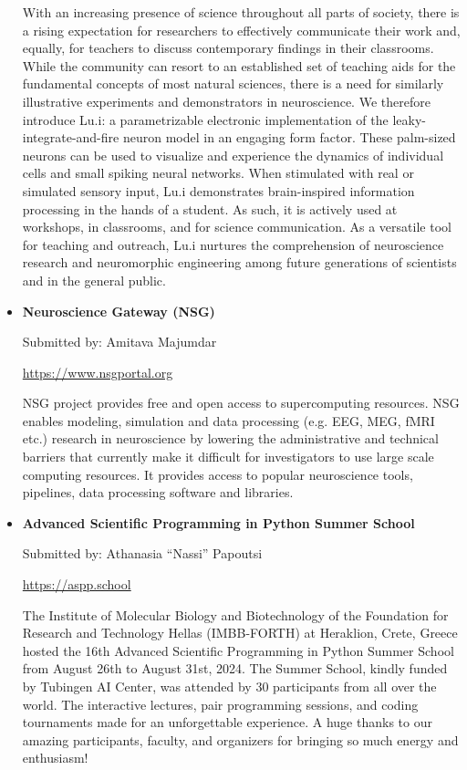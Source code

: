 \begin{itemize}
        With an increasing presence of science throughout all parts of society, there is a rising expectation for researchers to effectively communicate their work and, equally, for teachers to discuss contemporary findings in their classrooms. While the community can resort to an established set of teaching aids for the fundamental concepts of most natural sciences, there is a need for similarly illustrative experiments and demonstrators in neuroscience. We therefore introduce Lu.i: a parametrizable electronic implementation of the leaky-integrate-and-fire neuron model in an engaging form factor. These palm-sized neurons can be used to visualize and experience the dynamics of individual cells and small spiking neural networks. When stimulated with real or simulated sensory input, Lu.i demonstrates brain-inspired information processing in the hands of a student. As such, it is actively used at workshops, in classrooms, and for science communication. As a versatile tool for teaching and outreach, Lu.i nurtures the comprehension of neuroscience research and neuromorphic engineering among future generations of scientists and in the general public.

    \item \textbf{Neuroscience Gateway (NSG)}

        Submitted by: Amitava Majumdar

        \url{https://www.nsgportal.org}

        NSG project provides free and open access to supercomputing resources. NSG enables modeling, simulation and data processing (e.g. EEG, MEG, fMRI etc.) research in neuroscience by lowering the administrative and technical barriers that currently make it difficult for investigators to use large scale computing resources. It provides access to popular neuroscience tools, pipelines, data processing software and libraries.


\end{itemize}
\newpage
\begin{itemize}
    \item \textbf{Advanced Scientific Programming in Python Summer School}

        Submitted by: Athanasia \enquote{Nassi} Papoutsi

        \url{https://aspp.school}

        The Institute of Molecular Biology and Biotechnology of the Foundation for Research and Technology Hellas (IMBB-FORTH) at Heraklion, Crete, Greece hosted the 16th Advanced Scientific Programming in Python Summer School from August 26th to August 31st, 2024. The Summer School, kindly funded by Tubingen AI Center, was attended by 30 participants from all over the world. The interactive lectures, pair programming sessions, and coding tournaments made for an unforgettable experience. A huge thanks to our amazing participants, faculty, and organizers for bringing so much energy and enthusiasm!

\end{itemize}

